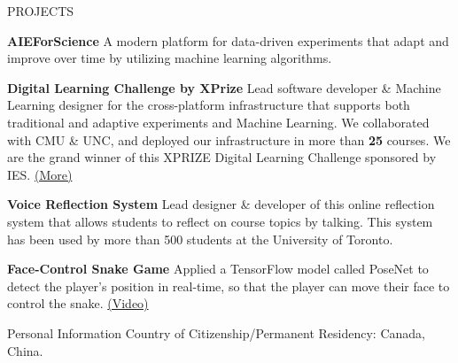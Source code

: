 \documentclass{resume} %
\begin{document}
\begin{rSection}{PROJECTS}
\vspace{-1.25em}
\item \textbf{AIEForScience} {A modern platform for data-driven experiments that adapt and improve over time by utilizing machine learning algorithms.}

\item \textbf{Digital Learning Challenge by XPrize} {Lead software developer \& Machine Learning designer for the cross-platform infrastructure that supports both traditional and adaptive experiments and Machine Learning. We collaborated with CMU \& UNC, and deployed our infrastructure in more than \textbf{25} courses. We are the grand winner of this XPRIZE Digital Learning Challenge sponsored by IES. \href{https://www.xprize.org/challenge/digitallearning/finalist-teams}{(More)}}

\item \textbf{Voice Reflection System} {Lead designer \& developer of this online reflection system that allows students to reflect on course topics by talking. This system has been used by more than 500 students at the University of Toronto.}

\item \textbf{Face-Control Snake Game} {Applied a TensorFlow model called PoseNet to detect the player's position in real-time, so that the player can move their face to control the snake. \href{https://www.youtube.com/watch?v=Zn_5Oy7DZJw}{(Video)}}
\end{rSection} 

\begin{rSection}{Personal Information}
    Country of Citizenship/Permanent Residency: Canada, China.
\end{rSection}
\end{document}

